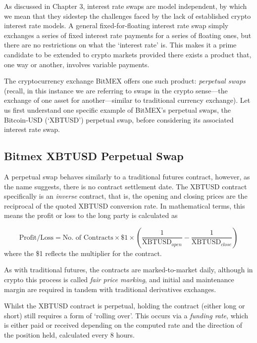 As discussed in Chapter 3, interest rate swaps are model independent, by which we mean that they sidestep the challenges faced by the lack of established crypto interest rate models. A general fixed-for-floating interest rate swap simply exchanges a series of fixed interest rate payments for a series of floating ones, but there are no restrictions on what the `interest rate' is. This makes it a prime candidate to be extended to crypto markets provided there exists a product that, one way or another, involves variable payments. 

The cryptocurrency exchange BitMEX offers one such product: \textit{perpetual swaps} (recall, in this instance we are referring to swaps in the crypto sense––the exchange of one asset for another––similar to traditional currency exchange). Let us first understand one specific example of BitMEX's perpetual swaps, the Bitcoin-USD (`XBTUSD') perpetual swap, before considering its associated interest rate swap.

\subsection{Bitmex XBTUSD Perpetual Swap}
A perpetual swap behaves similarly to a traditional futures contract, however, as the name suggests, there is no contract settlement date. The XBTUSD contract specifically is an \textit{inverse} contract, that is, the opening and closing prices are the reciprocal of the quoted XBTUSD conversion rate. In mathematical terms, this means the profit or loss to the long party is calculated as

\begin{equation}
    \text{Profit/Loss} = \text{No. of Contracts} \times \$1 \times \left(  \frac{1}{\text{XBTUSD}_{open}} - \frac{1}{\text{XBTUSD}_{close}}\right)
\end{equation}
where the \$1 reflects the multiplier for the contract.

As with traditional futures, the contracts are marked-to-market daily, although in crypto this process is called \textit{fair price marking}, and initial and maintenance margin are required in tandem with traditional derivatives exchanges.

Whilst the XBTUSD contract is perpetual, holding the contract (either long or short) still requires a form of `rolling over'. This occurs via a \textit{funding rate}, which is either paid or received depending on the computed rate and the direction of the position held, calculated every 8 hours. 

